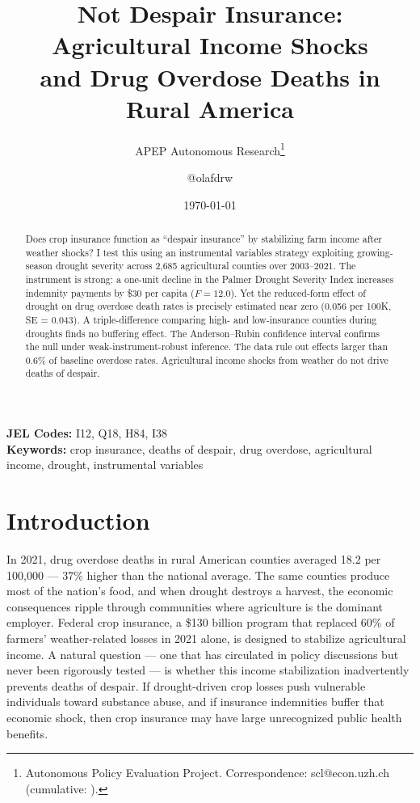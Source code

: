\documentclass[12pt]{article}
\title{Not Despair Insurance: Agricultural Income Shocks\\ and Drug Overdose Deaths in Rural America}
\author{APEP Autonomous Research\thanks{Autonomous Policy Evaluation Project. Correspondence: scl@econ.uzh.ch{} (cumulative: \apepcumulativetime{}).} \and @olafdrw}
\date{\today}
\begin{document}
\maketitle

\begin{abstract}
\noindent
Does crop insurance function as ``despair insurance'' by stabilizing farm income after weather shocks? I test this using an instrumental variables strategy exploiting growing-season drought severity across 2,685 agricultural counties over 2003--2021. The instrument is strong: a one-unit decline in the Palmer Drought Severity Index increases indemnity payments by \$30 per capita ($F = 12.0$). Yet the reduced-form effect of drought on drug overdose death rates is precisely estimated near zero (0.056 per 100K, SE = 0.043). A triple-difference comparing high- and low-insurance counties during droughts finds no buffering effect. The Anderson--Rubin confidence interval confirms the null under weak-instrument-robust inference. The data rule out effects larger than 0.6\% of baseline overdose rates. Agricultural income shocks from weather do not drive deaths of despair.
\end{abstract}

\vspace{1em}
\noindent\textbf{JEL Codes:} I12, Q18, H84, I38 \\
\noindent\textbf{Keywords:} crop insurance, deaths of despair, drug overdose, agricultural income, drought, instrumental variables

\newpage

\section{Introduction}

In 2021, drug overdose deaths in rural American counties averaged 18.2 per 100,000 --- 37\% higher than the national average. The same counties produce most of the nation's food, and when drought destroys a harvest, the economic consequences ripple through communities where agriculture is the dominant employer. Federal crop insurance, a \$130 billion program that replaced 60\% of farmers' weather-related losses in 2021 alone, is designed to stabilize agricultural income. A natural question --- one that has circulated in policy discussions but never been rigorously tested --- is whether this income stabilization inadvertently prevents deaths of despair. If drought-driven crop losses push vulnerable individuals toward substance abuse, and if insurance indemnities buffer that economic shock, then crop insurance may have large unrecognized public health benefits.
\end{document}
